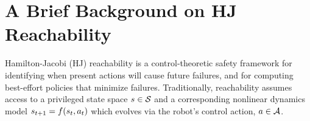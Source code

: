 
\section{A Brief Background on HJ Reachability}
\label{sec:hj-bg}

Hamilton-Jacobi (HJ) reachability \cite{mitchell2005time, margellos2011hamilton} is a control-theoretic safety framework for identifying when present actions will cause future failures, and for computing best-effort policies that minimize failures.  
Traditionally, reachability assumes access to a privileged state space $s \in \mathcal{S}$ and a corresponding nonlinear dynamics model $s_{t+1} = f(s_t, a_t)$ which evolves via the robot's control action, $a \in \mathcal{A}$.

